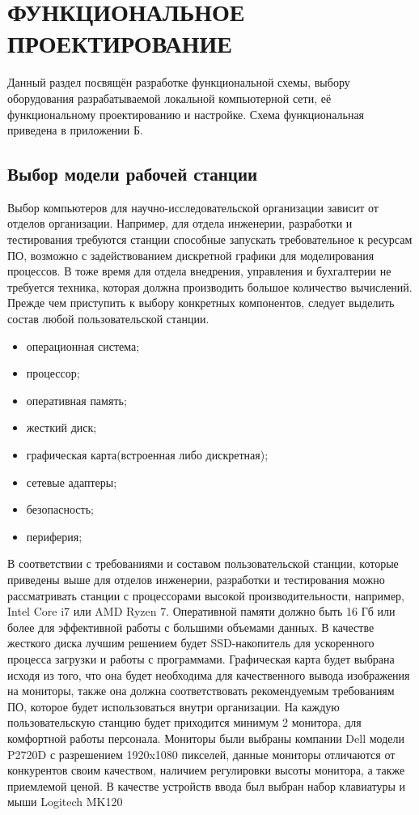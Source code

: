 \section{ФУНКЦИОНАЛЬНОЕ ПРОЕКТИРОВАНИЕ}
\label{sec:func}

Данный раздел посвящён разработке функциональной схемы, выбору оборудования 
разрабатываемой локальной компьютерной сети, её функциональному проектированию и настройке. 
Схема функциональная приведена в приложении Б. 

\subsection{Выбор модели рабочей станции}

Выбор компьютеров для научно-исследовательской организации зависит от отделов организации. 
Например, для отдела инженерии, разработки и тестирования требуются станции способные запускать требовательное к ресурсам ПО, 
возможно с задействованием дискретной графики для моделирования процессов. 
В тоже время для отдела внедрения, управления и бухгалтерии не требуется техника, которая должна производить большое количество вычислений.
Прежде чем приступить к выбору конкретных компонентов, следует выделить состав любой пользовательской станции.

\begin{itemize}
    \item операционная система;
    \item процессор;
    \item оперативная память;
    \item жесткий диск;
    \item графическая карта(встроенная либо дискретная);
    \item сетевые адаптеры;
    \item безопасность;
    \item периферия;
\end{itemize}

В соответствии с требованиями и составом пользовательской станции, которые приведены выше для отделов инженерии, разработки и тестирования
можно рассматривать станции с процессорами высокой производительности, например, Intel Core i7 или AMD Ryzen 7. Оперативной памяти должно быть 16 Гб 
или более для эффективной работы с большими объемами данных. В качестве жесткого диска лучшим решением будет SSD-накопитель для ускоренного процесса 
загрузки и работы с программами. Графическая карта будет выбрана исходя из того, что она будет необходима для качественного вывода изображения на мониторы,
также она должна соответствовать рекомендуемым требованиям ПО, которое будет использоваться внутри организации. На каждую пользовательскую станцию будет приходится
минимум 2 монитора, для комфортной работы персонала. Мониторы были выбраны компании Dell модели P2720D с разрешением 1920x1080 пикселей, данные мониторы отличаются от конкурентов своим качеством,
наличием регулировки высоты монитора, а также приемлемой ценой. В качестве устройств ввода был выбран набор клавиатуры и мыши Logitech MK120

